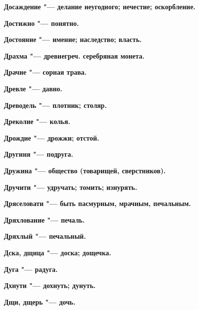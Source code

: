 \begin{mymulticols}{2}
\bfseries Досаждение\normalfont{} "--- делание неугодного; нечестие; оскорбление. 




\bfseries Достижно\normalfont{} "--- понятно. 




\bfseries Достояние\normalfont{} "--- имение; наследство; власть. 




\bfseries Драхма\normalfont{} "--- древнегреч. серебряная монета. 




\bfseries Драчие\normalfont{} "--- сорная трава. 




\bfseries Древле\normalfont{} "--- давно. 




\bfseries Древодель\normalfont{} "--- плотник; столяр. 




\bfseries Дреколие\normalfont{} "--- колья. 




\bfseries Дрождие\normalfont{} "--- дрожжи; отстой. 




\bfseries Другиня\normalfont{} "--- подруга. 




\bfseries Дружина\normalfont{} "--- общество (товарищей, сверстников). 




\bfseries Дручити\normalfont{} "--- удручать; томить; изнурять. 




\bfseries Дряселовати\normalfont{} "--- быть пасмурным, мрачным, печальным. 




\bfseries Дряхлование\normalfont{} "--- печаль. 




\bfseries Дряхлый\normalfont{} "--- печальный. 




\bfseries Дска, дщица\normalfont{} "--- доска; дощечка. 




\bfseries Дуга\normalfont{} "--- радуга. 




\bfseries Дхнути\normalfont{} "--- дохнуть; дунуть. 




\bfseries Дщи, дщерь\normalfont{} "--- дочь. 





\end{mymulticols}
